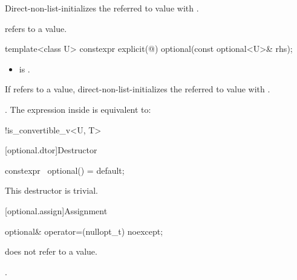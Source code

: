 \documentclass[a4paper,10pt,oneside,openany,final,article]{memoir}
\begin{document}
\begin{wording}
\begin{itemdescr}
    \pnum
    \effects
    Direct-non-list-initializes the referred to value with .

    \pnum
    \ensures
     refers to a value.

  \end{itemdescr}

  \begin{itemdecl}
    template<class U> constexpr explicit(@\seebelow@) optional(const optional<U>& rhs);
  \end{itemdecl}

  \begin{itemdescr}
    \pnum
    \constraints
    \begin{itemize}
    \item {} is .
    \end{itemize}

    \pnum
    \effects
    If  refers to a value,
    direct-non-list-initializes the referred to value with .

    \pnum
    \ensures
    .
    \remarks
    The expression inside  is equivalent to:
    \begin{codeblock}
      !is_convertible_v<U, T>
    \end{codeblock}

  \end{itemdescr}


  [optional.dtor]{Destructor}

  \begin{itemdecl}
    constexpr ~optional() = default;
  \end{itemdecl}
\begin{itemdescr}
\pnum
\remarks
This destructor is trivial.
\end{itemdescr}

  [optional.assign]{Assignment}

  \begin{itemdecl}
    optional& operator=(nullopt_t) noexcept;
  \end{itemdecl}

  \begin{itemdescr}
    \pnum
    \ensures
     does not refer to a value.

    \pnum
    \returns
    .
  \end{itemdescr}


\end{wording}
\end{document}
